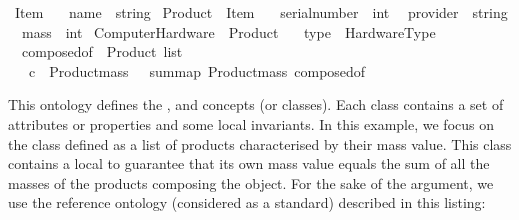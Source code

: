 \begin{isabellebody}
\begin{isamarkuptext}
\begin{isarbox}
\begin{isabelle}
\ Item\ {\isacharequal}{\kern0pt}\isanewline
\ \ name\ {\isacharcolon}{\kern0pt}{\isacharcolon}{\kern0pt}\ string\isanewline
{}\ Product\ {\isacharequal}{\kern0pt}\ Item\ {\isacharplus}{\kern0pt}\isanewline
\ \ serial{\isacharunderscore}{\kern0pt}number\ {\isacharcolon}{\kern0pt}{\isacharcolon}{\kern0pt}\ int\isanewline
\ \ provider\ {\isacharcolon}{\kern0pt}{\isacharcolon}{\kern0pt}\ string\isanewline
\ \ mass\ {\isacharcolon}{\kern0pt}{\isacharcolon}{\kern0pt}\ int\isanewline
{}\ Computer{\isacharunderscore}{\kern0pt}Hardware\ {\isacharequal}{\kern0pt}\ Product\ {\isacharplus}{\kern0pt}\isanewline
\ \ type\ {\isacharcolon}{\kern0pt}{\isacharcolon}{\kern0pt}\ Hardware{\isacharunderscore}{\kern0pt}Type\isanewline
\ \ composed{\isacharunderscore}{\kern0pt}of\ {\isacharcolon}{\kern0pt}{\isacharcolon}{\kern0pt}\ {\isachardoublequoteopen}Product\ list{\isachardoublequoteclose}\ \isanewline
\ \ \ c{}\ {\isacharcolon}{\kern0pt}{\isacharcolon}{\kern0pt}\ {\isachardoublequoteopen}Product{\isachardot}{\kern0pt}mass\ {\isasymsigma}\ {\isacharequal}{\kern0pt}\ sum{\isacharparenleft}{\kern0pt}map\ Product{\isachardot}{\kern0pt}mass\ {\isacharparenleft}{\kern0pt}composed{\isacharunderscore}{\kern0pt}of\ {\isasymsigma}{\isacharparenright}{\kern0pt}{\isacharparenright}{\kern0pt}{\isachardoublequoteclose}
\end{isabelle}
\end{isarbox}

This ontology defines the ,  and  concepts (or classes).  
Each class contains a set of attributes or properties and some local invariants.
In this example, we focus on the  
class defined as a list of products characterised by their mass value.
This class contains a local  to guarantee that its own mass value
equals the sum of all the masses of the products composing the object.
For the sake of the argument, we use the reference ontology (considered as a standard)
described in this listing:


\end{isamarkuptext}
\end{isabellebody}
